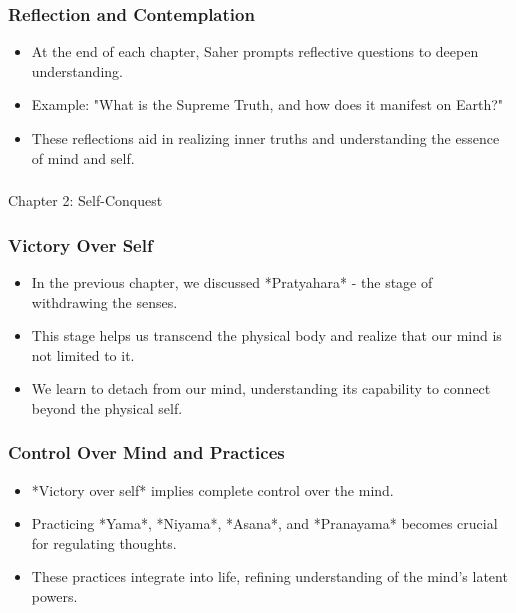 \begin{frame}[fragile]\frametitle{Reflection and Contemplation}
    \begin{itemize}
        \item At the end of each chapter, Saher prompts reflective questions to deepen understanding.
        \item Example: "What is the Supreme Truth, and how does it manifest on Earth?"
        \item These reflections aid in realizing inner truths and understanding the essence of mind and self.
    \end{itemize}
\end{frame}



\begin{frame}[fragile]\frametitle{}
\begin{center}
{\Large Chapter 2: Self-Conquest }
\end{center}
\end{frame}

\begin{frame}[fragile]\frametitle{Victory Over Self}
    \begin{itemize}
        \item In the previous chapter, we discussed *Pratyahara* - the stage of withdrawing the senses.
        \item This stage helps us transcend the physical body and realize that our mind is not limited to it.
        \item We learn to detach from our mind, understanding its capability to connect beyond the physical self.
    \end{itemize}
\end{frame}

\begin{frame}[fragile]\frametitle{Control Over Mind and Practices}
    \begin{itemize}
        \item *Victory over self* implies complete control over the mind.
        \item Practicing *Yama*, *Niyama*, *Asana*, and *Pranayama* becomes crucial for regulating thoughts.
        \item These practices integrate into life, refining understanding of the mind's latent powers.
    \end{itemize}
\end{frame}

